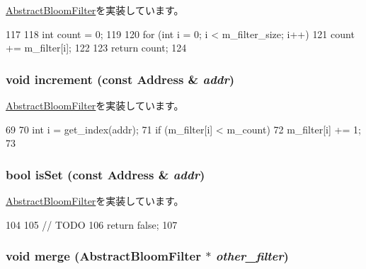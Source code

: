 \hyperlink{classAbstractBloomFilter_a25ea5e1ef3d4911226f37649b6efed22}{AbstractBloomFilter}を実装しています。


\begin{DoxyCode}
117 {
118     int count = 0;
119 
120     for (int i = 0; i < m_filter_size; i++) {
121         count += m_filter[i];
122     }
123     return count;
124 }
\end{DoxyCode}
\hypertarget{classLSB__CountingBloomFilter_a3e860ad851b771ac3b6eeb1716eb56bc}{
\subsubsection[{increment}]{\setlength{\rightskip}{0pt plus 5cm}void increment (const {\bf Address} \& {\em addr})}}
\label{classLSB__CountingBloomFilter_a3e860ad851b771ac3b6eeb1716eb56bc}


\hyperlink{classAbstractBloomFilter_af795f7fdeff0174e914ed1d792ffe4ff}{AbstractBloomFilter}を実装しています。


\begin{DoxyCode}
69 {
70     int i = get_index(addr);
71     if (m_filter[i] < m_count)
72         m_filter[i] += 1;
73 }
\end{DoxyCode}
\hypertarget{classLSB__CountingBloomFilter_a4200ee289c3d941a4b209c4788f8087c}{
\subsubsection[{isSet}]{\setlength{\rightskip}{0pt plus 5cm}bool isSet (const {\bf Address} \& {\em addr})}}
\label{classLSB__CountingBloomFilter_a4200ee289c3d941a4b209c4788f8087c}


\hyperlink{classAbstractBloomFilter_aa1b69d102655f8c5879b3df95eb205dc}{AbstractBloomFilter}を実装しています。


\begin{DoxyCode}
104 {
105     // TODO
106     return false;
107 }
\end{DoxyCode}
\hypertarget{classLSB__CountingBloomFilter_a4091f5f95de040d4e0ae5bd86817b13c}{
\subsubsection[{merge}]{\setlength{\rightskip}{0pt plus 5cm}void merge ({\bf AbstractBloomFilter} $\ast$ {\em other\_\-filter})}}
\label{classLSB__CountingBloomFilter_a4091f5f95de040d4e0ae5bd86817b13c}




